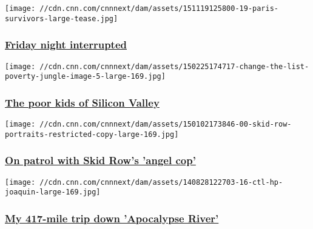 \href{/2015/11/20/world/paris-survivor-stories/index.html}{}

\texttt{[image: //cdn.cnn.com/cnnnext/dam/assets/151119125800-19-paris-survivors-large-tease.jpg]}

\hypertarget{friday-night-interrupted}{%
\subsubsection{\texorpdfstring{\href{/2015/11/20/world/paris-survivor-stories/index.html}{Friday
night
interrupted}}{Friday night interrupted}}\label{friday-night-interrupted}}

\href{http://www.cnn.com/interactive/2015/03/opinion/ctl-child-poverty/}{}

\texttt{[image: //cdn.cnn.com/cnnnext/dam/assets/150225174717-change-the-list-poverty-jungle-image-5-large-169.jpg]}

\hypertarget{the-poor-kids-of-silicon-valley}{%
\subsubsection{\texorpdfstring{\href{http://www.cnn.com/interactive/2015/03/opinion/ctl-child-poverty/}{The
poor kids of Silicon
Valley}}{The poor kids of Silicon Valley}}\label{the-poor-kids-of-silicon-valley}}

\href{/2015/01/02/us/skid-row-cop/index.html}{}

\texttt{[image: //cdn.cnn.com/cnnnext/dam/assets/150102173846-00-skid-row-portraits-restricted-copy-large-169.jpg]}

\hypertarget{on-patrol-with-skid-rows-angel-cop-}{%
\subsubsection{\texorpdfstring{\href{/2015/01/02/us/skid-row-cop/index.html}{On
patrol with Skid Row's 'angel cop'
}}{On patrol with Skid Row's 'angel cop' }}\label{on-patrol-with-skid-rows-angel-cop-}}

\href{http://www.cnn.com/interactive/2014/09/opinion/endangered-river-ctl/}{}

\texttt{[image: //cdn.cnn.com/cnnnext/dam/assets/140828122703-16-ctl-hp-joaquin-large-169.jpg]}

\hypertarget{my-417-mile-trip-down-apocalypse-river}{%
\subsubsection{\texorpdfstring{\href{http://www.cnn.com/interactive/2014/09/opinion/endangered-river-ctl/}{My
417-mile trip down 'Apocalypse
River'}}{My 417-mile trip down 'Apocalypse River'}}\label{my-417-mile-trip-down-apocalypse-river}}

